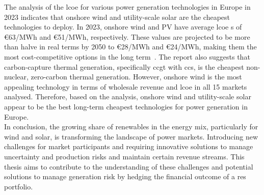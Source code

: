 
  The analysis of the \gls{lcoe} for various power generation technologies in Europe in 2023
  indicates that onshore wind and utility-scale solar are the cheapest technologies to deploy.
  In 2023, onshore wind and PV have average \gls{lcoe} s of €63/MWh and €51/MWh, respectively.
  These values are projected to be more than halve in real terms by 2050 to €28/MWh and €24/MWh,
  making them the most cost-competitive options in the long term~\cite{abdullah_europe_2023}.
  The report also suggests that carbon-capture thermal generation,
  specifically \gls{ccgt} with \gls{ccs}, is the cheapest non-nuclear, zero-carbon thermal generation.
  However, onshore wind is the most appealing technology in terms of wholesale revenue and \gls{lcoe}
  in all 15 markets analysed.
  Therefore, based on the analysis, onshore wind and utility-scale solar appear to be the best
  long-term cheapest technologies for power generation in Europe.\\

  In conclusion, the growing share of renewables in the energy mix, particularly for wind and solar,
  is transforming the landscape of power markets.
  Introducing new challenges for market participants and requiring innovative solutions to manage uncertainty and
  production risks and maintain certain revenue streams.
  This thesis aims to contribute to the understanding of these challenges and potential solutions
  to manage generation risk by hedging the financial outcome of a \gls{res} portfolio.

